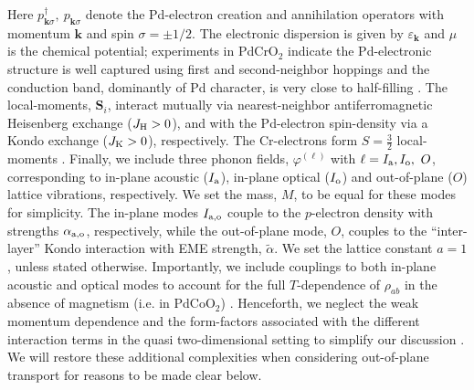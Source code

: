 \documentclass[aps,prl,twocolumn,superscriptaddress,amsmath,nofootinbib,10pt,floatfix]{revtex4-2}
\begin{document}
{Here $p^{\dagger}_{\boldsymbol{k}\sigma},~p^{\phantom\dagger}_{\boldsymbol{k}\sigma}$ denote the Pd-electron creation and annihilation operators with momentum $\boldsymbol{k}$ and spin $\sigma=\pm 1/2$. The electronic dispersion is given by $\varepsilon_{\boldsymbol{k}}$ and $\mu$ is the chemical potential; experiments in PdCrO$_2$ indicate the Pd-electronic structure is well captured using first and second-neighbor hoppings and the conduction band, dominantly of Pd character, is very close to half-filling \cite{sunko_probing_2020, Hicks2015}. The local-moments, $\boldsymbol{S}_i$, interact mutually via nearest-neighbor antiferromagnetic Heisenberg exchange ($J_{\rm H}>0$), and with the Pd-electron spin-density via a Kondo exchange ($J_{\rm K}>0$), respectively. The Cr-electrons form $S=\frac{3}{2}$ local-moments \cite{sunko_probing_2020}. Finally, we include three phonon fields, $\varphi^{(\ell)}$ with $\ell=I_{\rm{a}},I_{\rm{o}},~O$, corresponding to in-plane acoustic ($I_{\rm a}$), in-plane optical ($I_{\rm o}$) and out-of-plane ($O$) lattice vibrations, respectively. We set the mass, $M$, to be equal for these modes for simplicity. The in-plane modes $I_{\rm a,o}$ couple to the $p$-electron density with strengths $\alpha_{\rm a,o}$, respectively, while the out-of-plane mode, $O$, couples to the ``inter-layer'' Kondo interaction with EME strength, $\widetilde{\alpha}$. We set the lattice constant $a=1$, unless stated otherwise. Importantly, we include couplings to both in-plane acoustic and optical modes to account for the full $T$-dependence of $\rho_{ab}$ in the absence of magnetism (i.e. in PdCoO$_2$) \cite{takatsu_roles_2007}. Henceforth, we neglect the weak momentum dependence and the form-factors associated with the different interaction terms in the quasi two-dimensional setting to simplify our discussion \cite{sunko_probing_2020}. We will restore these additional complexities when considering out-of-plane transport for reasons to be made clear below.
}
\end{document}
